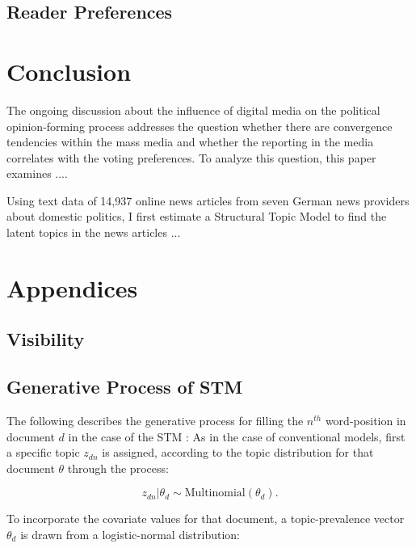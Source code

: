\documentclass[12pt,a4paper,notitlepage]{article}
\begin{document}
\subsection{Reader Preferences}\label{ch_readerpref}

\section{Conclusion}

The ongoing discussion about the influence of digital media on the political opinion-forming process addresses the question whether there are convergence tendencies within the mass media and whether the reporting in the media correlates with the voting preferences. To analyze this question, this paper examines .... 

Using text data of 14,937 online news articles from seven German news providers about domestic politics, I first estimate a Structural Topic Model to find the latent topics in the news articles ...

\pagebreak

\printbibliography

\appendix
\section{Appendices}

\subsection{Visibility}\label{a_visibility}



\subsection{Generative Process of STM}\label{a_generativeProcess}

 The following describes the generative process for filling the $n^{th}$ word-position in document $d$ in the case of the STM \citep{roberts_structural_2013}: As in the case of conventional models, first a specific topic $z_{dn}$ is assigned, according to the topic distribution for that document $\theta$ through the process:

\begin{equation}
	z_{dn}|\theta_d \sim \textrm{Multinomial}(\theta_d).
\end{equation}

To incorporate the covariate values for that document, a topic-prevalence vector $\theta_d$ is drawn from a logistic-normal distribution:
\end{document}
